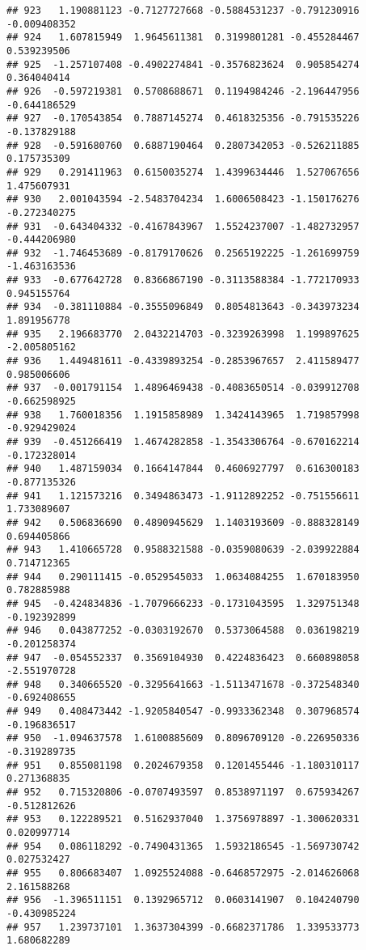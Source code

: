 \documentclass[
]{article}
\begin{document}
\begin{verbatim}
## 923   1.190881123 -0.7127727668 -0.5884531237 -0.791230916 -0.009408352
## 924   1.607815949  1.9645611381  0.3199801281 -0.455284467  0.539239506
## 925  -1.257107408 -0.4902274841 -0.3576823624  0.905854274  0.364040414
## 926  -0.597219381  0.5708688671  0.1194984246 -2.196447956 -0.644186529
## 927  -0.170543854  0.7887145274  0.4618325356 -0.791535226 -0.137829188
## 928  -0.591680760  0.6887190464  0.2807342053 -0.526211885  0.175735309
## 929   0.291411963  0.6150035274  1.4399634446  1.527067656  1.475607931
## 930   2.001043594 -2.5483704234  1.6006508423 -1.150176276 -0.272340275
## 931  -0.643404332 -0.4167843967  1.5524237007 -1.482732957 -0.444206980
## 932  -1.746453689 -0.8179170626  0.2565192225 -1.261699759 -1.463163536
## 933  -0.677642728  0.8366867190 -0.3113588384 -1.772170933  0.945155764
## 934  -0.381110884 -0.3555096849  0.8054813643 -0.343973234  1.891956778
## 935   2.196683770  2.0432214703 -0.3239263998  1.199897625 -2.005805162
## 936   1.449481611 -0.4339893254 -0.2853967657  2.411589477  0.985006606
## 937  -0.001791154  1.4896469438 -0.4083650514 -0.039912708 -0.662598925
## 938   1.760018356  1.1915858989  1.3424143965  1.719857998 -0.929429024
## 939  -0.451266419  1.4674282858 -1.3543306764 -0.670162214 -0.172328014
## 940   1.487159034  0.1664147844  0.4606927797  0.616300183 -0.877135326
## 941   1.121573216  0.3494863473 -1.9112892252 -0.751556611  1.733089607
## 942   0.506836690  0.4890945629  1.1403193609 -0.888328149  0.694405866
## 943   1.410665728  0.9588321588 -0.0359080639 -2.039922884  0.714712365
## 944   0.290111415 -0.0529545033  1.0634084255  1.670183950  0.782885988
## 945  -0.424834836 -1.7079666233 -0.1731043595  1.329751348 -0.192392899
## 946   0.043877252 -0.0303192670  0.5373064588  0.036198219 -0.201258374
## 947  -0.054552337  0.3569104930  0.4224836423  0.660898058 -2.551970728
## 948   0.340665520 -0.3295641663 -1.5113471678 -0.372548340 -0.692408655
## 949   0.408473442 -1.9205840547 -0.9933362348  0.307968574 -0.196836517
## 950  -1.094637578  1.6100885609  0.8096709120 -0.226950336 -0.319289735
## 951   0.855081198  0.2024679358  0.1201455446 -1.180310117  0.271368835
## 952   0.715320806 -0.0707493597  0.8538971197  0.675934267 -0.512812626
## 953   0.122289521  0.5162937040  1.3756978897 -1.300620331  0.020997714
## 954   0.086118292 -0.7490431365  1.5932186545 -1.569730742  0.027532427
## 955   0.806683407  1.0925524088 -0.6468572975 -2.014626068  2.161588268
## 956  -1.396511151  0.1392965712  0.0603141907  0.104240790 -0.430985224
## 957   1.239737101  1.3637304399 -0.6682371786  1.339533773  1.680682289

\end{verbatim}
\end{document}
